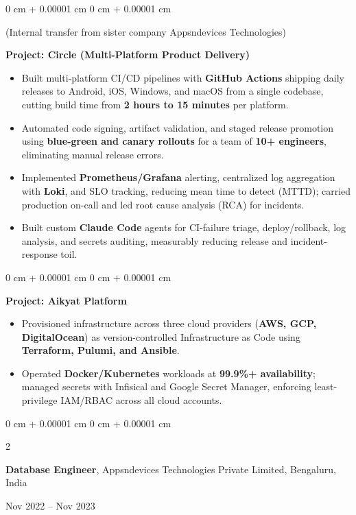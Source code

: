\documentclass[10pt, a4paper]{article}
\newenvironment{highlights}{
    \begin{itemize}[
        topsep=0.05 cm,
        parsep=0.04 cm,
        partopsep=0pt,
        itemsep=0pt,
        leftmargin=0 cm + 10pt
    ]
}{
    \end{itemize}
} %
\newenvironment{onecolentry}{
    \begin{adjustwidth}{
        0 cm + 0.00001 cm
    }{
        0 cm + 0.00001 cm
    }
}{
    \end{adjustwidth}
} %
\newenvironment{twocolentry}[2][]{
    \onecolentry
    \def\secondColumn{#2}
    \setcolumnwidth{\fill, 4.5 cm}
    \begin{paracol}{2}
}{
    \switchcolumn \raggedleft \secondColumn
    \end{paracol}
    \endonecolentry
} %
\begin{document}
\begin{onecolentry}
(Internal transfer from sister company Appsndevices Technologies)
\vspace{0.05 cm}

\textbf{Project: Circle (Multi-Platform Product Delivery)}
\begin{highlights}
\item Built multi-platform CI/CD pipelines with \textbf{GitHub Actions} shipping daily releases to Android, iOS, Windows, and macOS from a single codebase, cutting build time from \textbf{2 hours to 15 minutes} per platform.
\item Automated code signing, artifact validation, and staged release promotion using \textbf{blue-green and canary rollouts} for a team of \textbf{10+ engineers}, eliminating manual release errors.
\item Implemented \textbf{Prometheus/Grafana} alerting, centralized log aggregation with \textbf{Loki}, and SLO tracking, reducing mean time to detect (MTTD); carried production on-call and led root cause analysis (RCA) for incidents.
\item Built custom \textbf{Claude Code} agents for CI-failure triage, deploy/rollback, log analysis, and secrets auditing, measurably reducing release and incident-response toil.
\end{highlights}
\end{onecolentry}

\vspace{0.08 cm}

\begin{onecolentry}
\textbf{Project: Aikyat Platform}
\begin{highlights}
\item Provisioned infrastructure across three cloud providers (\textbf{AWS, GCP, DigitalOcean}) as version-controlled Infrastructure as Code using \textbf{Terraform, Pulumi, and Ansible}.
\item Operated \textbf{Docker/Kubernetes} workloads at \textbf{99.9\%+ availability}; managed secrets with Infisical and Google Secret Manager, enforcing least-privilege IAM/RBAC across all cloud accounts.
\end{highlights}
\end{onecolentry}

\vspace{0.10 cm}

\begin{twocolentry}{Nov 2022 -- Nov 2023}
\textbf{Database Engineer}, Appsndevices Technologies Private Limited, Bengaluru, India
\end{twocolentry}
\end{document}
